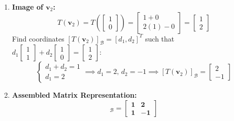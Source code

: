\begin{enumerate}
\begin{equation*}
    \end{equation*}
    \item \textbf{Image of $\mathbf{v}_2$:}
    \begin{equation*}
    T(\mathbf{v}_2) = T\left(\begin{bmatrix} 1 \\ 0 \end{bmatrix}\right) = \begin{bmatrix} 1 + 0 \\ 2(1) - 0 \end{bmatrix} = \begin{bmatrix} 1 \\ 2 \end{bmatrix}
    \end{equation*}
    Find coordinates $[T(\mathbf{v}_2)]_\mathcal{B} = [d_1, d_2]^T$ such that $d_1 \begin{bmatrix} 1 \\ 1 \end{bmatrix} + d_2 \begin{bmatrix} 1 \\ 0 \end{bmatrix} = \begin{bmatrix} 1 \\ 2 \end{bmatrix}$:
    \begin{equation*}
    \begin{cases} d_1 + d_2 = 1 \\ d_1 = 2 \end{cases} \implies d_1 = 2, \, d_2 = -1 \implies [T(\mathbf{v}_2)]_{\mathcal{B}} = \begin{bmatrix} 2 \\ -1 \end{bmatrix}
    \end{equation*}
    \item \textbf{Assembled Matrix Representation:}
    \begin{equation*}
    [T]_{\mathcal{B}} = \mathbf{\begin{bmatrix} 1 & 2 \\ 1 & -1 \end{bmatrix}}
    \end{equation*}
\end{enumerate}

